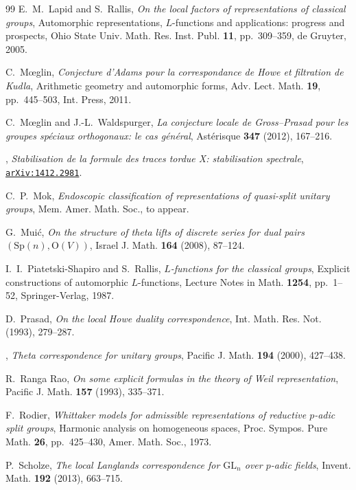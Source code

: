 \documentclass[11pt]{amsart}
\numberwithin{equation}{section}
\theoremstyle{plain}
\theoremstyle{definition}
\theoremstyle{remark}
\begin{document}
\begin{thebibliography}{99}
E.~M.~Lapid and S.~Rallis,
\emph{On the local factors of representations of classical groups},
Automorphic representations, $L$-functions and applications: progress and prospects,
Ohio State Univ. Math. Res. Inst. Publ. \textbf{11}, pp.~309--359, de Gruyter, 2005.

C.~M{\oe}glin,
\emph{Conjecture d'Adams pour la correspondance de Howe et filtration de Kudla},
Arithmetic geometry and automorphic forms,
Adv. Lect. Math. \textbf{19}, pp.~445--503, Int. Press, 2011.

C.~M{\oe}glin and J.-L.~Waldspurger,
\emph{La conjecture locale de Gross--Prasad pour les groupes sp\'eciaux orthogonaux: le cas g\'en\'eral},
Ast\'erisque \textbf{347} (2012), 167--216.

\bysame,
\emph{Stabilisation de la formule des traces tordue X: stabilisation spectrale},
\href{http://arxiv.org/abs/1412.2981}{\texttt{arXiv:1412.2981}}.

C.~P.~Mok,
\emph{Endoscopic classification of representations of quasi-split unitary groups},
Mem. Amer. Math. Soc., to appear.

G.~Mui\'c,
\emph{On the structure of theta lifts of discrete series for dual pairs $(\mathrm{Sp}(n),\mathrm{O}(V))$},
Israel J. Math. \textbf{164} (2008), 87--124.

I.~I.~Piatetski-Shapiro and S.~Rallis,
\emph{$L$-functions for the classical groups}, 
Explicit constructions of automorphic $L$-functions,
Lecture Notes in Math. \textbf{1254}, pp.~1--52, Springer-Verlag, 1987.

D.~Prasad,
\emph{On the local Howe duality correspondence},
Int. Math. Res. Not. (1993), 279--287.

\bysame,
\emph{Theta correspondence for unitary groups},
Pacific J. Math. \textbf{194} (2000), 427--438.

R.~Ranga Rao,
\emph{On some explicit formulas in the theory of Weil representation},
Pacific J. Math. \textbf{157} (1993), 335--371.

F.~Rodier,
\emph{Whittaker models for admissible representations of reductive $p$-adic split groups},
Harmonic analysis on homogeneous spaces,
Proc. Sympos. Pure Math. \textbf{26}, pp.~425--430, Amer. Math. Soc., 1973.

P.~Scholze,
\emph{The local Langlands correspondence for $\mathrm{GL}_n$ over $p$-adic fields},
Invent. Math. \textbf{192} (2013), 663--715.


\end{thebibliography}
\end{document}

